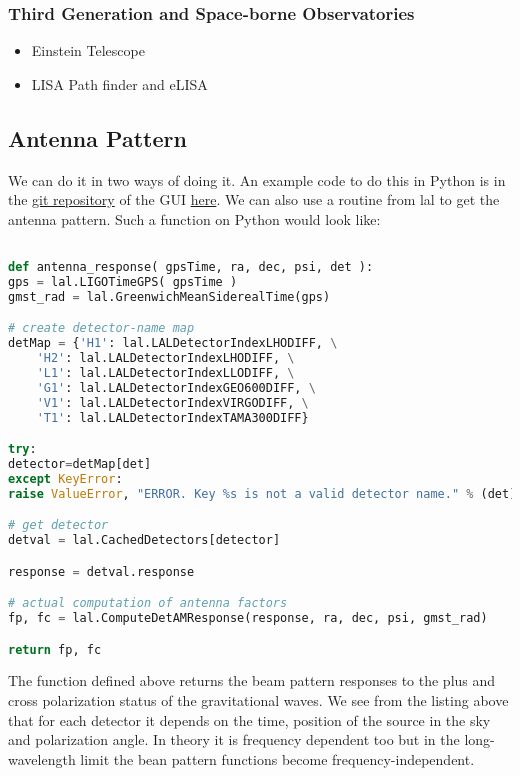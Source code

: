 \documentclass[11pt,fleqn]{book} %
\begin{document}
\subsubsection{Third Generation and Space-borne Observatories }
\vspace{.3 cm}

\begin{itemize}
	\item Einstein Telescope
	\item LISA Path finder and eLISA
\end{itemize}

\subsection{Antenna Pattern}

We can do it in two ways of doing it. An example code to do this in Python is in the \href{https://github.com/manuelmarcano22/aLIGO-wxPython}{git repository}  of the GUI \href{https://github.com/manuelmarcano22/aLIGO-wxPython/blob/master/antennamod.py}{here}. We can also use a routine from lal to get the antenna pattern. Such a function on Python would look like:\\


\begin{lstlisting}[language= Python,style=Python,caption={Antenna Response of a detector},label={lst:antenna}]

def antenna_response( gpsTime, ra, dec, psi, det ):
gps = lal.LIGOTimeGPS( gpsTime )
gmst_rad = lal.GreenwichMeanSiderealTime(gps)

# create detector-name map
detMap = {'H1': lal.LALDetectorIndexLHODIFF, \
	'H2': lal.LALDetectorIndexLHODIFF, \
	'L1': lal.LALDetectorIndexLLODIFF, \
	'G1': lal.LALDetectorIndexGEO600DIFF, \
	'V1': lal.LALDetectorIndexVIRGODIFF, \
	'T1': lal.LALDetectorIndexTAMA300DIFF}

try:
detector=detMap[det]
except KeyError:
raise ValueError, "ERROR. Key %s is not a valid detector name." % (det)

# get detector
detval = lal.CachedDetectors[detector]

response = detval.response

# actual computation of antenna factors
fp, fc = lal.ComputeDetAMResponse(response, ra, dec, psi, gmst_rad)

return fp, fc

\end{lstlisting}

The function defined above returns the beam pattern responses to the plus and cross polarization status of the gravitational waves. We see from the listing above that for each detector it depends on the time, position of the source in the sky and polarization angle. In theory it is frequency dependent too but in the long-wavelength limit the bean pattern functions become frequency-independent. 
\end{document}
